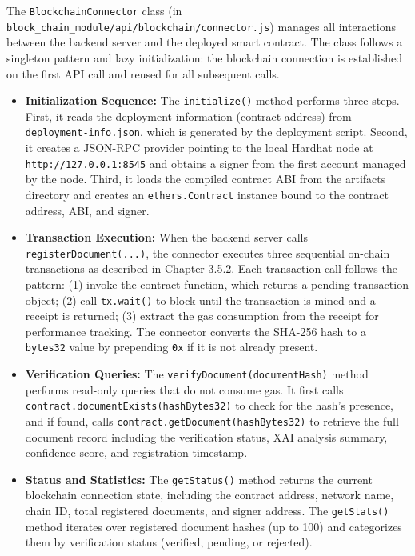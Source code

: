The \texttt{BlockchainConnector} class (in \texttt{block\_chain\_module/api/blockchain/connector.js}) manages all interactions between the backend server and the deployed smart contract. The class follows a singleton pattern and lazy initialization: the blockchain connection is established on the first API call and reused for all subsequent calls.
\begin{itemize}
    
\item \textbf{Initialization Sequence:} The \texttt{initialize()} method performs three steps. First, it reads the deployment information (contract address) from \texttt{deployment-info.json}, which is generated by the deployment script. Second, it creates a JSON-RPC provider pointing to the local Hardhat node at \texttt{http://127.0.0.1:8545} and obtains a signer from the first account managed by the node. Third, it loads the compiled contract ABI from the artifacts directory and creates an \texttt{ethers.Contract} instance bound to the contract address, ABI, and signer.

\item \textbf{Transaction Execution:} When the backend server calls \texttt{registerDocument(...)}, the connector executes three sequential on-chain transactions as described in Chapter 3.5.2. Each transaction call follows the pattern: (1) invoke the contract function, which returns a pending transaction object; (2) call \texttt{tx.wait()} to block until the transaction is mined and a receipt is returned; (3) extract the gas consumption from the receipt for performance tracking. The connector converts the SHA-256 hash to a \texttt{bytes32} value by prepending \texttt{0x} if it is not already present.

\item \textbf{Verification Queries:} The \texttt{verifyDocument(documentHash)} method performs read-only queries that do not consume gas. It first calls \texttt{contract.documentExists(hashBytes32)} to check for the hash's presence, and if found, calls \texttt{contract.getDocument(hashBytes32)} to retrieve the full document record including the verification status, XAI analysis summary, confidence score, and registration timestamp.

\item \textbf{Status and Statistics:} The \texttt{getStatus()} method returns the current blockchain connection state, including the contract address, network name, chain ID, total registered documents, and signer address. The \texttt{getStats()} method iterates over registered document hashes (up to 100) and categorizes them by verification status (verified, pending, or rejected).
\end{itemize}

